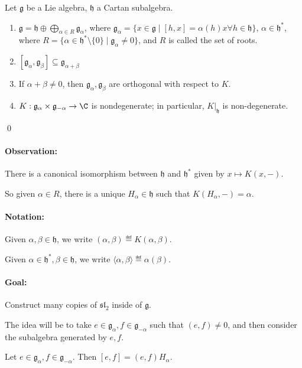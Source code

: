 \documentclass[x11names,reqno,14pt]{extarticle}
\newcommand{\mk}[1]{\mathfrak{#1}}
\newcommand{\g}{\mk{g}}
\newcommand{\h}{\mk{h}}
\renewcommand{\sl}{\mk{s}\mk{l}}
\begin{document}
\thm
Let $\g$ be a Lie algebra, $\h$ a Cartan subalgebra. 
\,
\begin{enumerate}

\item $\g = \h\oplus\bigoplus_{\alpha\in R}\g_\alpha$, where $\g_\alpha = \{x\in\g \mid [h,x] = \alpha(h)x\forall h \in \h\}$, $\alpha \in \h^*$, where $R = \{\alpha\in \h^*\setminus\{0\} \mid \g_\alpha\neq0\}$, and $R$ is called the set of roots. 

\item $[\g_\alpha,\g_\beta] \subseteq \g_{\alpha+\beta}$

\item If $\alpha+\beta\neq0$, then $\g_\alpha,\g_\beta$ are orthogonal with respect to $K$. 

\item $K:\g_\alpha\times\g_{-\alpha} \to \C$ is nondegenerate; in particular, $K|_\h$ is non-degenerate. 

\end{enumerate}

\proof

\qed

\paragraph{Observation:} There is a canonical isomorphism between $\h$ and $\h^*$ given by $x \mapsto K(x,-)$. 

So given $\alpha \in R$, there is a unique $H_\alpha \in \h$ such that $K(H_\alpha,-) = \alpha$. 

\paragraph{Notation:} Given $\alpha,\beta\in\h$, we write $(\alpha,\beta) \eqdef K(\alpha,\beta)$. 

Given $\alpha \in \h^*, \beta\in\h$, we write $\langle\alpha,\beta\rangle \eqdef \alpha(\beta)$. 

\paragraph{Goal:} Construct many copies of $\sl_2$ inside of $\g$. 

The idea will be to take $e \in \g_\alpha, f \in \g_{-\alpha}$ such that $(e,f) \neq 0$, and then consider the subalgebra generated by $e, f$. 

\lem

Let $e \in \g_\alpha, f \in \g_{-\alpha}$. Then $[e,f] = (e,f)H_\alpha$. 
\end{document}
